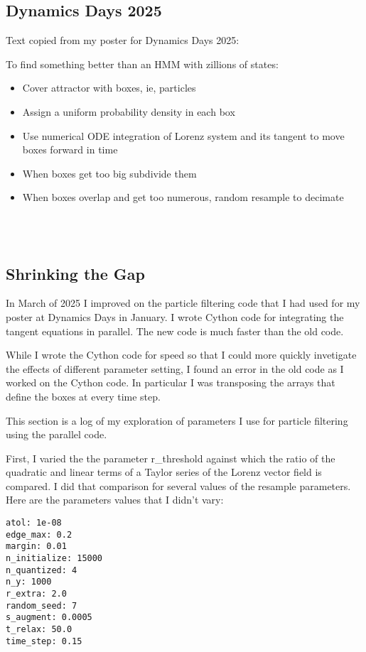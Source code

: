 \documentclass[12pt]{article}
\begin{document}
\subsection{Dynamics Days 2025}
\label{sec:particle_result}

Text copied from my poster for Dynamics Days 2025:

To find something better than an HMM with zillions of states:
\begin{itemize}
\item Cover attractor with boxes, ie, particles
\item Assign a uniform probability density in each box
\item Use numerical ODE integration of Lorenz system and its tangent
  to move boxes forward in time
\item When boxes get too big subdivide them
\item When boxes overlap and get too numerous, random resample to
  decimate
\end{itemize}
\begin{center}
  \\
  \\
\end{center}

\subsection{Shrinking the Gap}
\label{sec:particle_search}

In March of 2025 I improved on the particle filtering code that I had
used for my poster at Dynamics Days in January.  I wrote Cython code
for integrating the tangent equations in parallel.  The new code is
much faster than the old code.

While I wrote the Cython code for speed so that I could more quickly
invetigate the effects of different parameter setting, I found an
error in the old code as I worked on the Cython code.  In particular I
was transposing the arrays that define the boxes at every time step.

This section is a log of my exploration of parameters I use for
particle filtering using the parallel code.

First, I varied the the parameter r\_threshold against which the ratio
of the quadratic and linear terms of a Taylor series of the Lorenz
vector field is compared.  I did that comparison for several values of
the resample parameters.  Here are the parameters values that I didn't
vary:
\begin{verbatim}
atol: 1e-08
edge_max: 0.2
margin: 0.01
n_initialize: 15000
n_quantized: 4
n_y: 1000
r_extra: 2.0
random_seed: 7
s_augment: 0.0005
t_relax: 50.0
time_step: 0.15
\end{verbatim}
\end{document}

